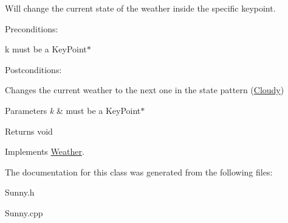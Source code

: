 Will change the current state of the weather inside the specific keypoint. 

Preconditions\+:
\begin{DoxyItemize}
\item k must be a Key\+Point$\ast$
\end{DoxyItemize}

Postconditions\+:
\begin{DoxyItemize}
\item Changes the current weather to the next one in the state pattern (\hyperlink{classCloudy}{Cloudy})
\end{DoxyItemize}


\begin{DoxyParams}{Parameters}
{\em k} & must be a Key\+Point$\ast$ \\
\hline
\end{DoxyParams}
\begin{DoxyReturn}{Returns}
void 
\end{DoxyReturn}


Implements \hyperlink{classWeather}{Weather}.



The documentation for this class was generated from the following files\+:\begin{DoxyCompactItemize}
\item 
Sunny.\+h\item 
Sunny.\+cpp\end{DoxyCompactItemize}
